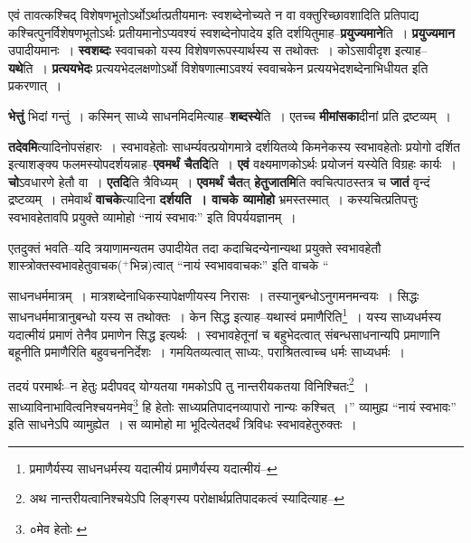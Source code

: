 \documentclass[article,12pt,a4paper]{memoir}
\newcommand{\add}[1]{($^{+}$#1)}
\begin{document}
	  \pstart एवं तावत्कश्चिद् विशेषणभूतोऽर्थोऽर्थात्प्रतीयमानः स्वशब्देनोच्यते न वा वक्तुरिच्छावशादिति प्रतिपाद्य कश्चित्पुनर्विशेषणभूतोऽर्थः प्रतीयमानोऽप्यवश्यं स्वशब्देनोपादेय इति दर्शयितुमाह--\textbf{प्रयुज्यमाने}ति । \textbf{प्रयुज्यमान} उपादीयमानः । \textbf{स्वशब्दः} स्ववाचको यस्य विशेषणरूपस्यार्थस्य स तथोक्तः । कोऽसावीदृश इत्याह--\textbf{यथे}ति । \textbf{प्रत्ययभेदः} प्रत्ययभेदलक्षणोऽर्थो विशेषणात्माऽवश्यं स्ववाचकेन प्रत्ययभेदशब्देनाभिधीयत इति प्रकरणात् ।
	\pend
      

	  \pstart \textbf{भेत्तुं} भिदां गन्तुं । कस्मिन् साध्ये साधनमिदमित्याह--\textbf{शब्दस्ये}ति । एतच्च \textbf{मीमांसका}दीनां प्रति द्रष्टव्यम् ।
	\pend
      

	  \pstart \textbf{तदेवमि}त्यादिनोपसंहारः । स्वभावहेतोः साधर्म्यवत्प्रयोगमात्रे दर्शयितव्ये किमनेकस्य स्वभावहेतोः प्रयोगो दर्शित इत्याशङ्क्य फलमस्योपदर्शयन्नाह--\textbf{एवमर्थं चैतदि}ति । \textbf{एवं} वक्ष्यमाणकोऽर्थः प्रयोजनं यस्येति विग्रहः कार्यः । \textbf{चो}ऽवधारणे हेतौ वा । \textbf{एतदि}ति त्रैविध्यम् । \textbf{एवमर्थं चैत}त् \textbf{हेतुजातमि}ति क्वचित्पाठस्तत्र च \textbf{जातं} वृन्दं द्रष्टव्यम् । तमेवार्थं \textbf{वाचके}त्यादिना \textbf{दर्शयति । वाचके व्यामोहो} भ्रमस्तस्मात् । कस्यचित्प्रतिपत्तुः स्वभावहेतावपि प्रयुक्ते व्यामोहो “नायं स्वभावः” इति विपर्ययज्ञानम् ।
	\pend
      

	  \pstart एतदुक्तं भवति--यदि त्रयाणामन्यतम उपादीयेत तदा कदाचिदन्येनान्यथा प्रयुक्ते स्वभावहेतौ शास्त्रोक्तस्वभावहेतुवाचक\add{भिन्न}त्वात् “नायं स्वभाववाचकः” इति वाचके  \leavevmode{} “
	  
	साधनधर्ममात्रम् । मात्रशब्देनाधिकस्यापेक्षणीयस्य निरासः । तस्यानुबन्धोऽनुगमनमन्वयः । सिद्धः साधनधर्ममात्रानुबन्धो यस्य स तथोक्तः । केन सिद्ध इत्याह--यथास्वं प्रमाणैरिति\footnote{प्रमाणैर्यस्य साधनधर्मस्य यदात्मीयं \cite{dp-msC} \cite{dp-msD} प्रमाणैर्यस्य यदात्मीयं--\cite{dp-msB}} । यस्य साध्यधर्मस्य यदात्मीयं प्रमाणं तेनैव प्रमाणेन सिद्ध इत्यर्थः । स्वभावहेतूनां च बहुभेदत्वात् संबन्धसाधनान्यपि प्रमाणानि बहूनीति प्रमाणैरिति बहुवचननिर्देशः । गमयितव्यत्वात् साध्यः, पराश्रितत्वाच्च धर्मः साध्यधर्मः । 
	  
	तदयं परमार्थः--न हेतुः प्रदीपवद् योग्यतया गमकोऽपि तु नान्तरीयकतया विनिश्चितः\footnote{अथ नान्तरीयत्वानिश्चयेऽपि लिङ्गस्य परोक्षार्थप्रतिपादकत्वं स्यादित्याह--\cite{dp-msD-n}} । साध्याविनाभावित्वनिश्चयनमेव\footnote{०मेव हेतोः \cite{dp-msB}} हि हेतोः साध्यप्रतिपादनव्यापारो नान्यः कश्चित् ।” व्यामुह्य “नायं स्वभावः” इति साधनेऽपि व्यामुह्येत । स व्यामोहो मा भूदित्येतदर्थं त्रिविधः स्वभावहेतुरुक्तः ।
	\pend
      
\end{document}
